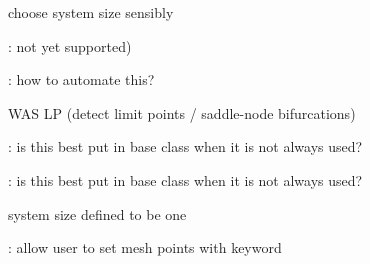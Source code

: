 \begin{DoxyRefList}
choose system size sensibly  
\item[\label{todo__todo000039}%
\Hypertarget{todo__todo000039}%
Global \hyperlink{class_mu_mo_t_1_1_mu_mo_tbifurcation_view_addecde06ced656af71c7c68c4e780fe8}{Mu\+Mo\+Tbifurcation\+View.axes} ]\+: not yet supported)  
\item[\label{todo__todo000037}%
\Hypertarget{todo__todo000037}%
Global \hyperlink{class_mu_mo_t_1_1_mu_mo_tbifurcation_view_a0a7557ffe670b6a318afa8bd9851d2fc}{Mu\+Mo\+Tbifurcation\+View.Max\+Step\+Size} ]\+: how to automate this?  
\item[\label{todo__todo000038}%
\Hypertarget{todo__todo000038}%
Global \hyperlink{class_mu_mo_t_1_1_mu_mo_tbifurcation_view_a040a7ecbcbaca807aeaec6d5c81801d5}{Mu\+Mo\+Tbifurcation\+View.Save\+Eigen} ]W\+AS \textquotesingle{}LP\textquotesingle{} (detect limit points / saddle-\/node bifurcations)  
\item[\label{todo__todo000016}%
\Hypertarget{todo__todo000016}%
Global \hyperlink{class_mu_mo_t_1_1_mu_mo_tcontroller_a018864aa22d2adb0d3958fb0adbce8e2}{Mu\+Mo\+Tcontroller.\+\_\+progress\+Bar} ]\+: is this best put in base class when it is not always used?  
\item[\label{todo__todo000017}%
\Hypertarget{todo__todo000017}%
Global \hyperlink{class_mu_mo_t_1_1_mu_mo_tcontroller_a1da52cde6b2b94a1005eaa6898d2f8c5}{Mu\+Mo\+Tcontroller.\+\_\+progress\+Bar\+\_\+multi} ]\+: is this best put in base class when it is not always used?  
\item[\label{todo__todo000027}%
\Hypertarget{todo__todo000027}%
Global \hyperlink{class_mu_mo_t_1_1_mu_mo_tfield_view_a0f5fba57766067c941f5a96b22545ed4}{Mu\+Mo\+Tfield\+View.\+\_\+\+Xdot} ]system size defined to be one 

\+: allow user to set mesh points with keyword 


\end{DoxyRefList}

